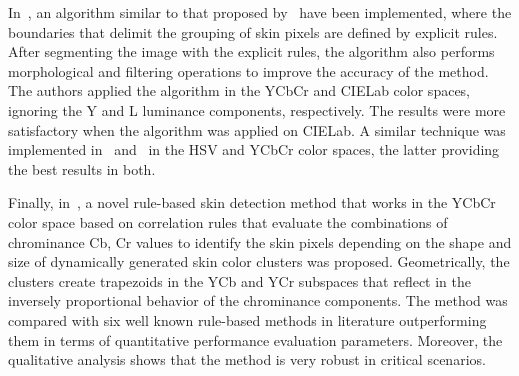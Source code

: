 In~\citet{kaur:12}, an algorithm similar to that proposed by~\citet{kovac:03} have been implemented, where the boundaries that delimit the grouping of skin pixels are defined by explicit rules. After segmenting the image with the explicit rules, the algorithm also performs morphological and filtering operations to improve the accuracy of the method. The authors applied the algorithm in the YCbCr and CIELab color spaces, ignoring the Y and L luminance components, respectively. The results were more satisfactory when the algorithm was applied on CIELab. A similar technique was implemented in~\citet{shaik:15} and~\citet{kumar:15} in the HSV and YCbCr color spaces, the latter providing the best results in both.

Finally, in~\citet{brancati:17}, a novel rule-based skin detection method that works in the YCbCr color space based on correlation rules that evaluate the combinations of chrominance Cb, Cr values to identify the skin pixels depending on the shape and size of dynamically generated skin color clusters was proposed. Geometrically, the clusters create trapezoids in the YCb and YCr subspaces that reflect in the inversely proportional behavior of the chrominance components. The method was compared with six well known rule-based methods in literature outperforming them in terms of quantitative performance evaluation parameters. Moreover, the qualitative analysis shows that the method is very robust in critical scenarios.